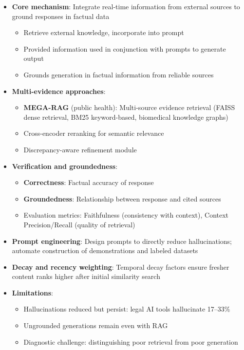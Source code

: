 \documentclass[11pt,letterpaper]{article}
\begin{document}
\begin{itemize}[leftmargin=*]
\item \textbf{Core mechanism}: Integrate real-time information from external sources to ground responses in factual data
  \begin{itemize}
  \item Retrieve external knowledge, incorporate into prompt
  \item Provided information used in conjunction with prompts to generate output
  \item Grounds generation in factual information from reliable sources
  \end{itemize}

\item \textbf{Multi-evidence approaches}:
  \begin{itemize}
  \item \textbf{MEGA-RAG} (public health): Multi-source evidence retrieval (FAISS dense retrieval, BM25 keyword-based, biomedical knowledge graphs)
  \item Cross-encoder reranking for semantic relevance
  \item Discrepancy-aware refinement module
  \end{itemize}

\item \textbf{Verification and groundedness}:
  \begin{itemize}
  \item \textbf{Correctness}: Factual accuracy of response
  \item \textbf{Groundedness}: Relationship between response and cited sources
  \item Evaluation metrics: Faithfulness (consistency with context), Context Precision/Recall (quality of retrieval)
  \end{itemize}

\item \textbf{Prompt engineering}: Design prompts to directly reduce hallucinations; automate construction of demonstrations and labeled datasets

\item \textbf{Decay and recency weighting}: Temporal decay factors ensure fresher content ranks higher after initial similarity search

\item \textbf{Limitations}:
  \begin{itemize}
  \item Hallucinations reduced but persist: legal AI tools hallucinate 17--33\%
  \item Ungrounded generations remain even with RAG
  \item Diagnostic challenge: distinguishing poor retrieval from poor generation
  \end{itemize}
\end{itemize}
\end{document}
